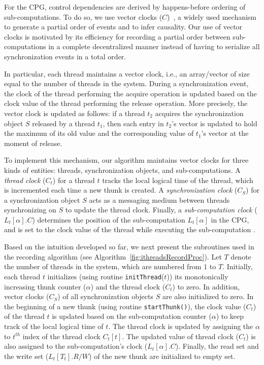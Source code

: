  
 

 For the CPG, control dependencies are derived by 
happens-before ordering of sub-computations. To do so, we use vector clocks
($C$)~\cite{Mattern89virtualtime},  a widely used mechanism to generate a partial order of events and to infer causality. Our use of vector
clocks is motivated by its efficiency for recording a partial order between sub-computations in a complete decentralized manner instead of having to serialize all synchronization events in a total order.

In particular, each thread maintains a vector clock, i.e., an array/vector of size equal to the number of threads in the system.  
During a synchronization event, the clock of the thread performing the
acquire operation is updated based on the clock value of the thread performing
the release operation.  More precisely, the vector clock is updated as follows: if a thread $t_2$ acquires the synchronization
object $S$ released by a thread $t_1$, then each entry in $t_2$'s vector is
updated to hold the maximum of its old value and the corresponding value of
$t_1$'s vector at the moment of release.



To implement this mechanism, our algorithm maintains vector clocks for three kinds of
entities: threads,  synchronization objects, and sub-computations.  A {\em thread clock}
($C_t$) for a thread $t$ tracks the local logical time of the thread, which is
incremented each time a new thunk is created. A {\em synchronization clock}
($C_S$) for a synchronization object $S$ acts as a messaging medium  between
threads synchronizing on $S$ to update the thread clock. Finally, a {\em  sub-computation clock}
($L_t[\alpha].C$) determines the position of the sub-computation $L_t[\alpha]$
in the CPG, and is set to the clock value of the thread while executing the
sub-computation . 



Based on the intuition developed so far, we next present the
subroutines used in the recording algorithm (see
Algorithm~\ref{fig:ithreadsRecordProc}). Let $T$ denote the number of threads in the system, which are numbered from $1$ to $T$.  Initially, each thread $t$ initializes (using routine {\tt initThread}($t$)) its monotonically increasing thunk
counter ($\alpha$) and the thread clock ($C_t$) to zero. In addition, vector clocks ($C_S$) of all synchronization objects $S$ are also initialized to zero. 
In the beginning of a new thunk (using routine {\tt startThunk()}), the clock value ($C_t$) of the thread $t$ is
updated based on the sub-computation  counter ($\alpha$) to keep track of the local logical time of $t$. The thread clock is updated by assigning the $\alpha$ to $t^{th}$ index of the thread clock $C_t[t]$. The updated value of thread clock ($C_t$)   is also assigned to the sub-computation's clock ($L_t[\alpha].C$). Finally, the read set and the write set
($L_t[T_t].R/W$) of the new thunk are initialized to empty set.

